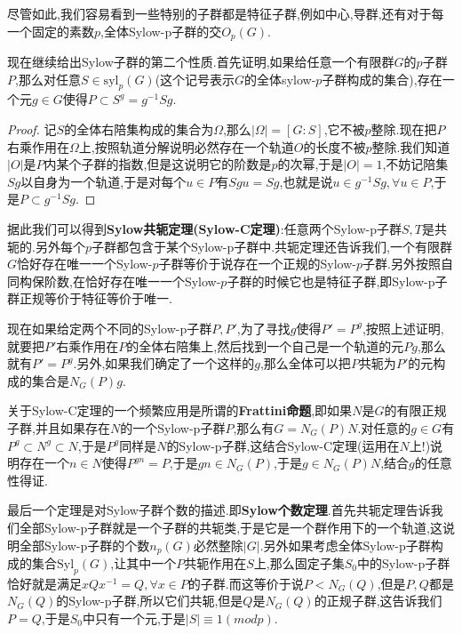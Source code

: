 尽管如此,我们容易看到一些特别的子群都是特征子群,例如中心,导群,还有对于每一个固定的素数$p$,全体Sylow-p子群的交$O_p(G)$.

现在继续给出Sylow子群的第二个性质.首先证明,如果给任意一个有限群$G$的$p$子群$P$,那么对任意$S\in\mathrm{syl}_p(G)$(这个记号表示$G$的全体sylow-$p$子群构成的集合),存在一个元$g\in G$使得$P\subset S^g=g^{-1}Sg$.
\begin{proof}
	
	记$S$的全体右陪集构成的集合为$\Omega$,那么$|\Omega|=[G:S]$,它不被$p$整除.现在把$P$右乘作用在$\Omega$上,按照轨道分解说明必然存在一个轨道$O$的长度不被$p$整除.我们知道$|O|$是$P$内某个子群的指数,但是这说明它的阶数是$p$的次幂,于是$|O|=1$,不妨记陪集$Sg$以自身为一个轨道,于是对每个$u\in P$有$Sgu=Sg$,也就是说$u\in g^{-1}Sg,\forall u\in P$,于是$P\subset g^{-1}Sg$.
\end{proof}

据此我们可以得到\textbf{Sylow共轭定理(Sylow-C定理)}:任意两个Sylow-p子群$S,T$是共轭的.另外每个$p$子群都包含于某个Sylow-p子群中.共轭定理还告诉我们,一个有限群$G$恰好存在唯一一个Sylow-$p$子群等价于说存在一个正规的Sylow-$p$子群.另外按照自同构保阶数,在恰好存在唯一一个Sylow-$p$子群的时候它也是特征子群,即Sylow-p子群正规等价于特征等价于唯一.

现在如果给定两个不同的Sylow-p子群$P,P'$,为了寻找$g$使得$P'=P^g$,按照上述证明,就要把$P'$右乘作用在$P$的全体右陪集上,然后找到一个自己是一个轨道的元$Pg$,那么就有$P'=P^g$.另外,如果我们确定了一个这样的$g$,那么全体可以把$P$共轭为$P'$的元构成的集合是$N_G(P)g$.

关于Sylow-C定理的一个频繁应用是所谓的\textbf{Frattini命题},即如果$N$是$G$的有限正规子群,并且如果存在$N$的一个Sylow-p子群$P$,那么有$G=N_G(P)N$.对任意的$g\in G$有$P^g\subset N^g\subset N$,于是$P^g$同样是$N$的Sylow-p子群,这结合Sylow-C定理(运用在$N$上!)说明存在一个$n\in N$使得$P^{gn}=P$,于是$gn\in N_G(P)$,于是$g\in N_G(P)N$,结合$g$的任意性得证.

最后一个定理是对Sylow子群个数的描述.即\textbf{Sylow个数定理}.首先共轭定理告诉我们全部Sylow-p子群就是一个子群的共轭类,于是它是一个群作用下的一个轨道,这说明全部Sylow-p子群的个数$n_p(G)$必然整除$|G|$.另外如果考虑全体Sylow-p子群构成的集合$\mathrm{Syl}_p(G)$,让其中一个$P$共轭作用在$S$上,那么固定子集$S_0$中的Sylow-p子群恰好就是满足$xQx^{-1}=Q,\forall x\in P$的子群.而这等价于说$P<N_G(Q)$,但是$P,Q$都是$N_G(Q)$的Sylow-p子群,所以它们共轭,但是$Q$是$N_G(Q)$的正规子群,这告诉我们$P=Q$,于是$S_0$中只有一个元,于是$|S|\equiv1(modp)$.

